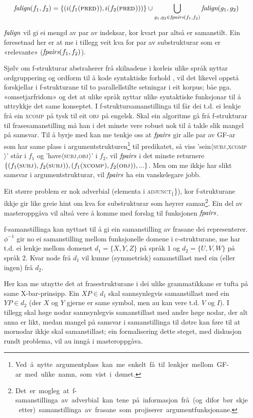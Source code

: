 \documentclass[11pt,a4paper,oneside,draft]{book}
\newcommand{\F}[2]{\textsc{#1}\ensuremath{_{#2}}}
\newcommand{\OBJ}{\F{obj}{}}
\newcommand{\XCOMP}{\F{xcomp}{}}
\newcommand{\SUBJ}{\F{subj}{}}
\newcommand{\PRED}{\F{pred}{}}
\newcommand{\falign}{\ensuremath{\operatorname{\emph{falign}}}}
\newcommand{\fpairs}{\ensuremath{\operatorname{\emph{fpairs}}}}
\begin{document}
\[
\falign(f_{1}, f_{2}) =
\{ (i(f_{1}(\PRED)), i(f_{2}(\PRED))) \}
\cup
\bigcup_{g_{1},g_{2}\in \fpairs(f_{1},f_{2})} \falign(g_{1}, g_{2})
\]

\falign{} vil gi ei mengd av par av indeksar, kor kvart par altså er
samanstilt. Ein føresetnad her er at me i tillegg veit kva for par av
substrukturar som er «relevante» ($\fpairs(f_{1},f_{2})$).

Sjølv om f-strukturar abstraherer frå skilnadene i korleis ulike språk
nyttar ordgruppering og ordform til å kode syntaktiske forhold
\citep[s.~14]{bresnan2001lfs}, vil det likevel oppstå forskjellar i
f-strukturane til to parallellstilte setningar i eit korpus; båe
pga. «omsetjarfridom» og det at ulike språk nyttar ulike syntaktiske
funksjonar til å uttrykkje det same konseptet. I
f-struktursamanstillinga til \citet[s.~40]{riezler2006gmt} får dei
t.d. ei lenkje frå ein \XCOMP{} på tysk til eit \OBJ{} på
engelsk. Skal ein algoritme gå frå f-strukturar til frasesamanstilling
må han i det minste vere robust nok til å takle slik mangel på
samsvar. Til å byrje med kan me tenkje oss at \fpairs{} gir alle par
av GF-ar som har same plass i
argumentstrukturen\footnote{Ved~å~nytte~argumentplass~kan~me~enkelt~få~til~lenkjer~mellom~GF-ar~med~ulike~namn,~som~vist~i~dømet.}
til predikatet, så viss 'sein$\langle$\SUBJ,\XCOMP$\rangle$' står i
$f_{1}$ og 'have$\langle$\SUBJ,\OBJ$\rangle$' i $f_{2}$, vil \fpairs{}
i det minste returnere
$\{(f_{1}(\SUBJ),f_{2}(\SUBJ)),(f_{1}(\XCOMP),f_{2}(\OBJ)),...\}$.
Men om me ikkje har slikt samsvar i argumentstrukturar, vil \fpairs{}
ha ein vanskelegare jobb.

Eit større problem er nok adverbial (elementa i \F{adjunct}\{\}), kor
f-strukturane ikkje gir like greie hint om kva for substrukturar som
høyrer
saman\footnote{Det~er~mogleg~at~f-samanstillinga~av~adverbial~kan~tene~på~informasjon~frå~(og~difor~bør~skje~etter)~samanstillinga~av~frasane~som~projiserer~argumentfunksjonane.}. Ein
del av masteroppgåva vil altså vere å komme med forslag til funksjonen
\fpairs{}.


f-samanstillinga kan nyttast til å gi ein samanstilling av frasane dei
representerer. $\phi^{-1}$ gir no ei samanstilling mellom funksjonelle
domene i c-strukturane, me har t.d. ei lenkje mellom domenet
$d_{1}=\{X, Y, Z\}$ på språk 1 og $d_{2}=\{U, V, W\}$ på språk 2. Kvar
node frå $d_{1}$ vil kunne (symmetrisk) samanstillast med ein (eller
ingen) frå $d_{2}$.

Her kan me utnytte det at frasestrukturane i dei ulike grammatikkane
er tufta på same X-bar-prinsipp. Ein $XP\in d_{1}$ skal sannsynlegvis
samanstillast med ein $YP\in d_{2}$ (der $X$ og $Y$ gjerne er same
symbol, men au kan vere t.d. $V$ og $I$). I tillegg skal høge nodar
sannsynlegvis samanstillast med andre høge nodar, der alt anna er
likt, medan mangel på samsvar i samanstillinga til døtre kan føre til
at mornodar ikkje skal samanstillast; ein formalisering dette steget,
med diskusjon rundt problema, vil au inngå i masteroppgåva.
\end{document}
